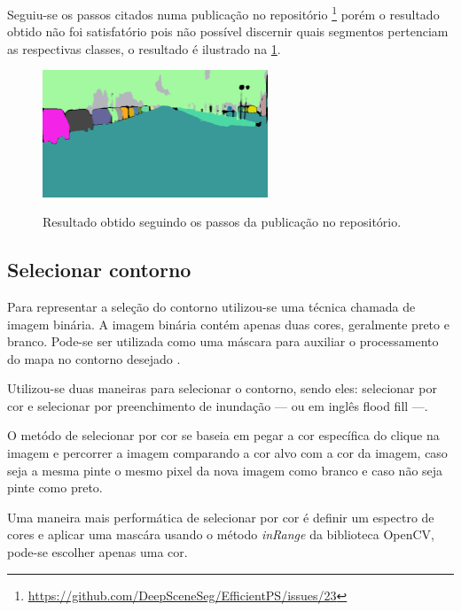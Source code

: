 Seguiu-se os passos citados numa publicação no repositório \footnote{\url{https://github.com/DeepSceneSeg/EfficientPS/issues/23}} porém o resultado obtido não foi satisfatório pois não possível discernir quais segmentos pertenciam as respectivas classes, o resultado é ilustrado na \cref{fig:resultado_obtido}.

\begin{figure}[!ht]
	\centering
    \caption{Resultado obtido seguindo os passos da publicação no repositório.}
	\includegraphics[width=0.6\textwidth]{figures/resultado_obtido.png}
	\label{fig:resultado_obtido}
\end{figure}

\subsection{Selecionar contorno}

Para representar a seleção do contorno utilizou-se uma técnica chamada de imagem binária.
A imagem  binária contém  apenas duas cores, geralmente preto e  branco. Pode-se ser utilizada como uma máscara para auxiliar o processamento do  mapa no contorno desejado \cite{Aznag2020}.

Utilizou-se duas maneiras para selecionar o contorno, sendo eles: selecionar por cor e selecionar por preenchimento de inundação — ou  em inglês  flood fill —.


O metódo de selecionar por cor se baseia em pegar a cor específica do clique na imagem e percorrer a imagem comparando a cor alvo com a cor da imagem, caso seja a mesma pinte o mesmo pixel da nova imagem como branco e caso não seja pinte como preto.

Uma maneira mais performática de selecionar por cor é definir um espectro de cores e aplicar uma mascára usando o método \textit{inRange} da biblioteca OpenCV, pode-se escolher apenas uma cor.


